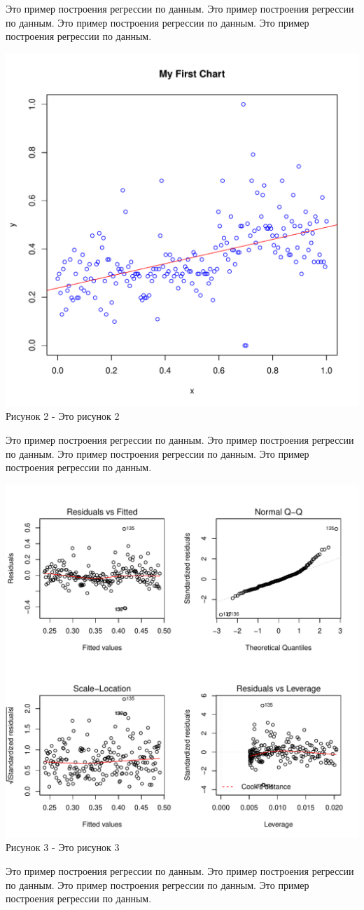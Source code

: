 \documentclass[oneside,a4paper,final,14pt]{article}
\begin{document}
Это пример построения регрессии по данным. Это пример построения регрессии по данным. Это пример построения регрессии по данным. Это пример построения регрессии по данным.

\begin{center}
	\includegraphics[scale=0.6]{images/firstplot.pdf}\\
	Рисунок 2 - Это рисунок 2
\end{center}

Это пример построения регрессии по данным. Это пример построения регрессии по данным. Это пример построения регрессии по данным. Это пример построения регрессии по данным.

\begin{center}
	\includegraphics[scale=0.9]{images/linearfit1.pdf}\\
	Рисунок 3 - Это рисунок 3
\end{center}

Это пример построения регрессии по данным. Это пример построения регрессии по данным. Это пример построения регрессии по данным. Это пример построения регрессии по данным.
\end{document}
